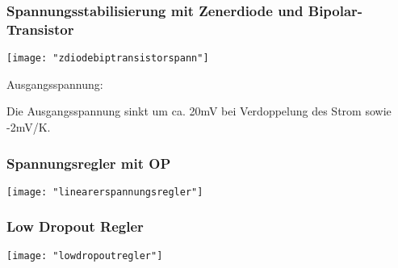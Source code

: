 \subsubsection{Spannungsstabilisierung mit Zenerdiode und Bipolar-Transistor}
\begin{minipage}[t]{0.3\textwidth}
	\vspace{0pt}								%
	\texttt{[image: "zdiodebiptransistorspann"]}
\end{minipage}\hspace{0.05\textwidth}
\begin{minipage}[t]{0.65\textwidth}
	\vspace{0pt}								%
	Ausgangsspannung: 
	
	Die Ausgangsspannung sinkt um ca. 20mV bei Verdoppelung des Strom sowie -2mV/K.
	
\end{minipage}
\vspace{2mm}


\subsubsection{Spannungsregler mit OP}
\begin{minipage}[t]{0.3\textwidth}
	\vspace{0pt}								%
	\texttt{[image: "linearerspannungsregler"]}
\end{minipage}\hspace{0.05\textwidth}
\begin{minipage}[t]{0.65\textwidth}
	\vspace{0pt}								%
\end{minipage}
\vspace{2mm}


\subsubsection{Low Dropout Regler}
\begin{minipage}[t]{0.3\textwidth}
	\vspace{0pt}								%
	\texttt{[image: "lowdropoutregler"]}
\end{minipage}\hspace{0.05\textwidth}
\begin{minipage}[t]{0.65\textwidth}
	\vspace{0pt}								%
	
\end{minipage}
\vspace{2mm}


